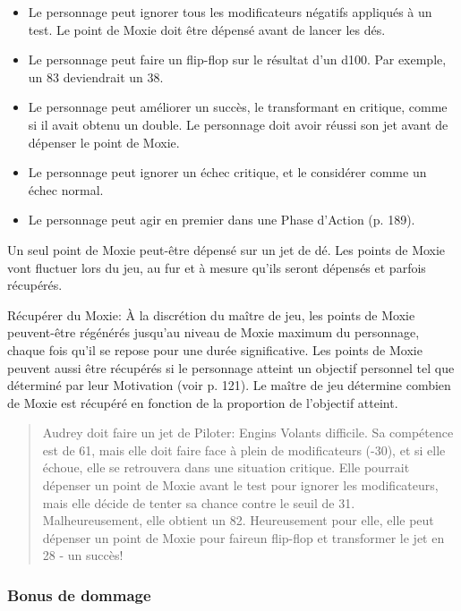 \begin{itemize}
   \item Le personnage peut ignorer tous les modificateurs négatifs appliqués à un test. Le point de Moxie doit être dépensé avant de lancer les dés.
   \item Le personnage peut faire un flip-flop sur le résultat d'un d100. Par exemple, un 83 deviendrait un 38.
   \item Le personnage peut améliorer un succès, le transformant en critique, comme si il avait obtenu un double. Le personnage doit avoir réussi son jet avant de dépenser le point de Moxie.
   \item Le personnage peut ignorer un échec critique, et le considérer comme un échec normal.
   \item Le personnage peut agir en premier dans une Phase d'Action (p. 189).
\end{itemize} 

Un seul point de Moxie peut-être dépensé sur un jet de dé. Les points de Moxie vont fluctuer lors du jeu, au fur et à mesure qu'ils seront dépensés et parfois récupérés. 

Récupérer du Moxie: À la discrétion du maître de jeu, les points de Moxie peuvent-être régénérés jusqu'au niveau de Moxie maximum du personnage, chaque fois qu'il se repose pour une durée significative. Les points de Moxie peuvent aussi être récupérés si le personnage atteint un objectif personnel tel que déterminé par leur Motivation (voir p. 121). Le maître de jeu détermine combien de Moxie est récupéré en fonction de la proportion de l'objectif atteint. 

\begin{quotation} Audrey doit faire un jet de Piloter: Engins Volants difficile. Sa compétence est de 61, mais elle doit faire face à plein de modificateurs (-30), et si elle échoue, elle se retrouvera dans une situation critique. Elle pourrait dépenser un point de Moxie avant le test pour ignorer les modificateurs, mais elle décide de tenter sa chance contre le seuil de 31. Malheureusement, elle obtient un 82. Heureusement pour elle, elle peut dépenser un point de Moxie pour faireun flip-flop et transformer le jet en 28 - un succès! \end{quotation} 

\subsubsection{Bonus de dommage} \label{sec:damage-bonus} 

